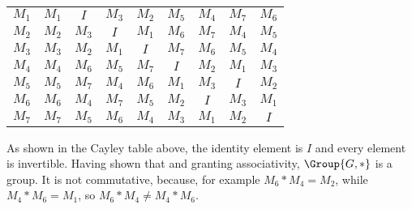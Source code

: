 \begin{enumerate}[label={\Alph*.},font={\bfseries}]
\begin{center}
\begin{tabular}{ c | c c c c c c c c }
      $M_1$ & $M_1$ & $I$ & $M_3$ & $M_2$ & $M_5$ & $M_4$ & $M_7$ & $M_6$ \\
      $M_2$ & $M_2$ & $M_3$ & $I$ & $M_1$ & $M_6$ & $M_7$ & $M_4$ & $M_5$ \\
      $M_3$ & $M_3$ & $M_2$ & $M_1$ & $I$ & $M_7$ & $M_6$ & $M_5$ & $M_4$ \\
      $M_4$ & $M_4$ & $M_6$ & $M_5$ & $M_7$ & $I$ & $M_2$ & $M_1$ & $M_3$ \\
      $M_5$ & $M_5$ & $M_7$ & $M_4$ & $M_6$ & $M_1$ & $M_3$ & $I$ & $M_2$ \\
      $M_6$ & $M_6$ & $M_4$ & $M_7$ & $M_5$ & $M_2$ & $I$ & $M_3$ & $M_1$ \\
      $M_7$ & $M_7$ & $M_5$ & $M_6$ & $M_4$ & $M_3$ & $M_1$ & $M_2$ & $I$
    \end{tabular}
  \end{center}

  As shown in the \gls{Cayley table} above, the identity element is $I$ and
  every element is invertible. Having shown that and granting associativity,
  $\Group{G, *}$ is a group. It is not commutative, because, for example
  $M_6 * M_4 = M_2$, while $M_4 * M_6 = M_1$, so $M_6 * M_4 \ne M_4 * M_6$.
  \newpage
  \begin{figure}[h]
\end{figure}
\end{enumerate}
